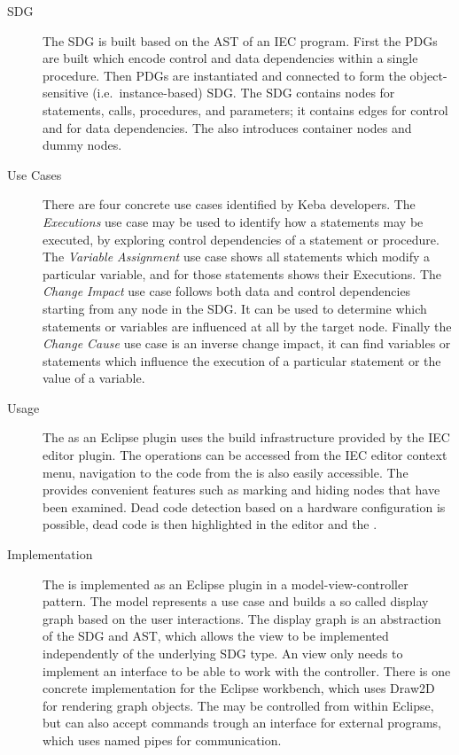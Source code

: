 \begin{description}
  \item[SDG] The SDG is built based on the AST of an IEC program. First the PDGs are built which encode control and 
  data dependencies within a single procedure. Then PDGs are instantiated and connected to form the object-sensitive 
  (i.e.\ instance-based) SDG. The SDG contains nodes for statements, calls, procedures, and parameters; it contains 
  edges for control and for data dependencies. The \SB also introduces container nodes and dummy nodes.
  
  \item[Use Cases] There are four concrete use cases identified by Keba developers. The \emph{Executions} use case may 
  be used to identify how a statements may be executed, by exploring control dependencies of a statement or procedure. 
  The \emph{Variable   Assignment} use case shows all statements which modify a particular variable, and for those 
  statements shows their Executions. The \emph{Change Impact} use case follows both data and control dependencies 
  starting from any node in the SDG. It can be used to determine which statements or variables are influenced at all by 
  the target node. Finally the \emph{Change Cause} use case is an inverse change impact, it can find variables or 
  statements which influence the execution of a particular statement or the value of a variable.
  
  \item[Usage] The \SB as an Eclipse plugin uses the build infrastructure provided by the IEC editor plugin. The \SB 
  operations can be accessed from the IEC editor context menu, navigation to the code from the \SB is also easily 
  accessible. The \SB provides convenient features such as marking and hiding nodes that have been examined. Dead code 
  detection based on a hardware configuration is possible, dead code is then highlighted in the editor and the \SB.
  
  \item[Implementation] The \SB is implemented as an Eclipse plugin in a model-view-controller pattern. The model 
  represents a use case and builds a so called display graph based on the user interactions. The display graph is an 
  abstraction of the SDG and AST, which allows the view to be implemented independently of the underlying SDG type. An 
  \SB view only needs to implement an interface to be able to work with the controller. There is one concrete 
  implementation for the Eclipse workbench, which uses Draw2D for rendering graph objects. The \SB may be controlled 
  from within Eclipse, but can also accept commands trough an interface for external programs, which uses named pipes 
  for communication.
\end{description}
